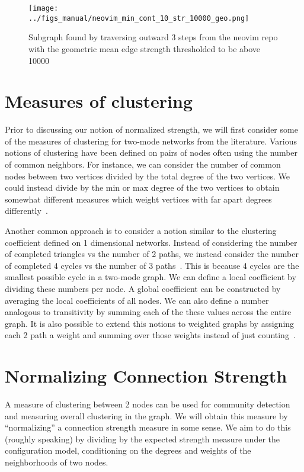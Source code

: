 \documentclass{pset}
\begin{document}
\begin{figure}[ht]
\centering
\texttt{[image: ../figs\_manual/neovim\_min\_cont\_10\_str\_10000\_geo.png]}
\caption{Subgraph found by traversing outward 3 steps from the neovim repo with
    the geometric mean edge strength thresholded to be above 10000}\label{fig:neovim geo}
\end{figure}

\section*{Measures of clustering}

Prior to discussing our notion of normalized strength,
we will first consider some of the measures of clustering for two-mode networks
from the literature.
Various notions of clustering have been defined on pairs of nodes
often using the number of common neighbors.
For instance, we can consider the number of common nodes between
two vertices divided by the total degree of the two vertices. We could instead
divide by
the min or max degree of the two vertices to obtain somewhat different
measures which weight vertices with far apart degrees differently~\cite{guillaume}.

Another common approach is to consider a notion similar to the clustering coefficient
defined on 1 dimensional networks. Instead of considering the number of completed
triangles vs the number of 2 paths, we instead consider the
number of completed 4 cycles vs the number of 3 paths~\cite{robins}.
This is because 4 cycles are the smallest possible cycle in a two-mode graph.
We can define a local coefficient by dividing these numbers per node.
A global coefficient can be constructed by averaging the local coefficients of
all nodes.
We can also define a number analogous to transitivity by summing each
of the these values across the entire graph.
It is also possible to extend this notions to weighted
graphs by assigning each 2 path a weight and summing over those weights instead
of just counting~\cite{opsahl}.

\section*{Normalizing Connection Strength}

A measure of clustering between 2 nodes can be used for community detection and
measuring overall clustering in the graph.   We will obtain this measure by
``normalizing'' a connection strength measure in some sense. We aim to do this
(roughly speaking) by dividing by the expected strength measure under
the configuration model, conditioning on the
degrees and weights of the neighborhoods of two nodes.
\end{document}
